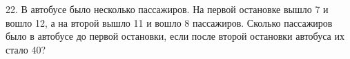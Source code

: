 22. В автобусе было несколько пассажиров. На первой остановке вышло 7 и вошло 12, а на второй вышло 11 и вошло 8 пассажиров. Сколько пассажиров было в автобусе до первой остановки, если после второй остановки автобуса их стало 40?\\
